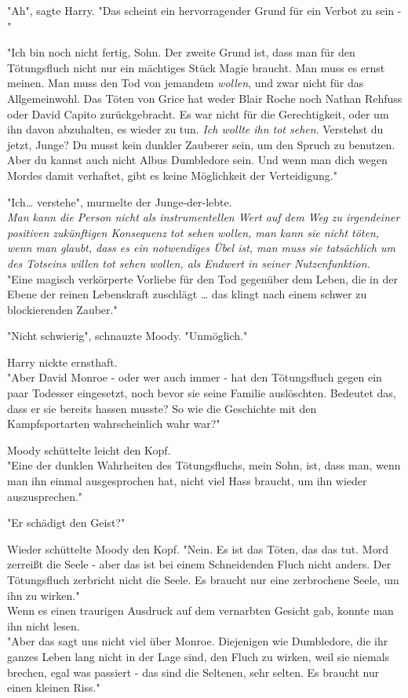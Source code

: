 {"Ah", sagte Harry. "Das scheint ein hervorragender Grund für ein Verbot zu sein -"

"Ich bin noch nicht fertig, Sohn. Der zweite Grund ist, dass man für den Tötungsfluch nicht nur ein mächtiges Stück Magie braucht. Man muss es ernst meinen. Man muss den Tod von jemandem \emph{wollen}, und zwar nicht für das Allgemeinwohl. Das Töten von Grice hat weder Blair Roche noch Nathan Rehfuss oder David Capito zurückgebracht. Es war nicht für die Gerechtigkeit, oder um ihn davon abzuhalten, es wieder zu tun. \emph{Ich wollte ihn tot sehen}. Verstehst du jetzt, Junge? Du musst kein dunkler Zauberer sein, um den Spruch zu benutzen. Aber du kannst auch nicht Albus Dumbledore sein. Und wenn man dich wegen Mordes damit verhaftet, gibt es keine Möglichkeit der Verteidigung."

"Ich… verstehe", murmelte der Junge-der-lebte.\\ \emph{Man kann die Person nicht als instrumentellen Wert auf dem Weg zu irgendeiner positiven zukünftigen Konsequenz tot sehen wollen, man kann sie nicht töten, wenn man glaubt, dass es ein notwendiges Übel ist, man muss sie tatsächlich um des Totseins willen tot sehen wollen, als Endwert in seiner Nutzenfunktion.}\\ "Eine magisch verkörperte Vorliebe für den Tod gegenüber dem Leben, die in der Ebene der reinen Lebenskraft zuschlägt … das klingt nach einem schwer zu blockierenden Zauber."

"Nicht schwierig", schnauzte Moody. "Unmöglich."

Harry nickte ernsthaft.\\ "Aber David Monroe - oder wer auch immer - hat den Tötungsfluch gegen ein paar Todesser eingesetzt, noch bevor sie seine Familie auslöschten. Bedeutet das, dass er sie bereits hassen musste? So wie die Geschichte mit den Kampfsportarten wahrscheinlich wahr war?"

Moody schüttelte leicht den Kopf.\\ "Eine der dunklen Wahrheiten des Tötungsfluchs, mein Sohn, ist, dass man, wenn man ihn einmal ausgesprochen hat, nicht viel Hass braucht, um ihn wieder auszusprechen."

"Er schädigt den Geist?"

Wieder schüttelte Moody den Kopf. "Nein. Es ist das Töten, das das tut. Mord zerreißt die Seele - aber das ist bei einem Schneidenden Fluch nicht anders. Der Tötungsfluch zerbricht nicht die Seele. Es braucht nur eine zerbrochene Seele, um ihn zu wirken."\\ Wenn es einen traurigen Ausdruck auf dem vernarbten Gesicht gab, konnte man ihn nicht lesen.\\ "Aber das sagt uns nicht viel über Monroe. Diejenigen wie Dumbledore, die ihr ganzes Leben lang nicht in der Lage sind, den Fluch zu wirken, weil sie niemals brechen, egal was passiert - das sind die Seltenen, sehr selten. Es braucht nur einen kleinen Riss."

}

